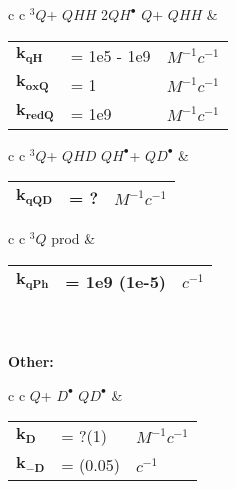 \documentclass{article}
\def\QH{$QH^{\bullet }$}
\def\D{$D^{\bullet }$}
\def\Q{$Q$}
\def\Qt{$^{3}Q$}
\def\QHH{$QHH$}
\def\QHD{$QHD$}
\def\QD{$QD^{\bullet }$}
\begin{document}
\begin{tabular}{ c c }
    \schemestart
    \Qt + \QHH
    \arrow{->[$k_{qH}$]}
    2\QH
    \arrow{<=>[$k_{redQ}$][$k_{oxQ}$]}
    \Q + \QHH
    \schemestop
     & \begin{tabular}{ l l l }
           $\mathbf{k_{qH}}$   & = 1e5 - 1e9 & $M^{-1}c^{-1}$ \\
           $\mathbf{k_{oxQ}}$  & = 1         & $M^{-1}c^{-1}$ \\
           $\mathbf{k_{redQ}}$ & = 1e9       & $M^{-1}c^{-1}$ \\\hline
       \end{tabular}
    \vspace{1.5mm}
\end{tabular}
\vspace{1.5mm}


\begin{tabular}{ c c }
    \schemestart
    \Qt + \QHD
    \arrow{->[$k_{qQD}$]}
    \QH + \QD
    \schemestop
     & \begin{tabular}{ l l l }
           $\mathbf{k_{qQD}}$ & = ? & $M^{-1}c^{-1}$ \\\hline
       \end{tabular}
    \vspace{1.5mm}
\end{tabular}
\vspace{1.5mm}


\begin{tabular}{ c c }
    \schemestart
    \Qt
    \arrow{->[$k_{qPh}$]}
    prod
    \schemestop
     & \begin{tabular}{ l l l }
           $\mathbf{k_{qPh}}$ & = 1e9 (1e-5) & $c^{-1}$ \\\hline
       \end{tabular}
    \vspace{1.5mm}
\end{tabular}
\vspace{1.5mm}
\\
\\
\textbf{Other:}

\begin{tabular}{ c c }
    \schemestart
    \Q + \D
    \arrow{<=>[$k_{D}$][$k_{-D}$]}
    \QD
    \schemestop
     & \begin{tabular}{ l l l }
           $\mathbf{k_{D}}$  & = ?(1)   & $M^{-1}c^{-1}$ \\
           $\mathbf{k_{-D}}$ & = (0.05) & $c^{-1}$       \\\hline
       \end{tabular}
    \vspace{1.5mm}
\end{tabular}
\vspace{1.5mm}
\end{document}
